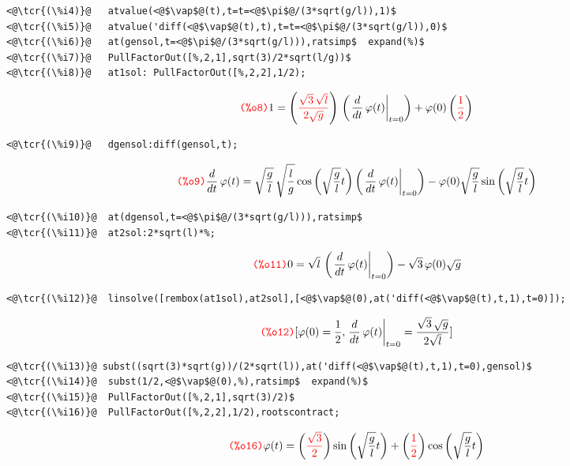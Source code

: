 \documentclass[../Maxima_Workbook.tex]{subfiles}
\begin{document}
\lz \begin{small}
\color{blue} \leqn
\begin{lstlisting}
<@\tcr{(\%i4)}@   atvalue(<@$\vap$@(t),t=t=<@$\pi$@/(3*sqrt(g/l)),1)$
<@\tcr{(\%i5)}@   atvalue('diff(<@$\vap$@(t),t),t=t=<@$\pi$@/(3*sqrt(g/l)),0)$
<@\tcr{(\%i6)}@   at(gensol,t=<@$\pi$@/(3*sqrt(g/l))),ratsimp$  expand(%)$
<@\tcr{(\%i7)}@   PullFactorOut([%,2,1],sqrt(3)/2*sqrt(l/g))$
<@\tcr{(\%i8)}@   at1sol: PullFactorOut([%,2,2],1/2);
\end{lstlisting}
\vspace{-4mm} \[\tag*{\tcr{\ttfamily (\%o8)}} 1=\left( \tcr{\frac{\sqrt{3}\, \sqrt{l}}{2 \sqrt{g}}} \right) \, \left( \left. \frac{d}{d t} \operatorname{\vap }(t)\right|_{t=0}\right) +\operatorname{\vap }(0) \left( \tcr{\frac{1}{2}} \right) \]
\vspace{-5mm} \begin{lstlisting}
<@\tcr{(\%i9)}@   dgensol:diff(gensol,t);
\end{lstlisting}
\vspace{-4mm} \[\tag*{\tcr{\ttfamily (\%o9)}} \frac{d}{d t} \operatorname{\vap }(t)=\sqrt{\frac{g}{l}}\, \sqrt{\frac{l}{g}} \cos{\left( \sqrt{\frac{g}{l}} t\right) } \left( \left. \frac{d}{d t} \operatorname{\vap }(t)\right|_{t=0}\right) -\operatorname{\vap }(0) \sqrt{\frac{g}{l}} \sin{\left( \sqrt{\frac{g}{l}} t\right) } \]
\vspace{-5mm} \begin{lstlisting}
<@\tcr{(\%i10)}@  at(dgensol,t=<@$\pi$@/(3*sqrt(g/l))),ratsimp$
<@\tcr{(\%i11)}@  at2sol:2*sqrt(l)*%;
\end{lstlisting}
\vspace{-4mm} \[\tag*{\tcr{\ttfamily (\%o11)}} 0=\sqrt{l}\, \left( \left. \frac{d}{d t} \operatorname{\vap }(t)\right|_{t=0}\right) -\sqrt{3} \operatorname{\vap }(0) \sqrt{g} \]
\vspace{-5mm} \begin{lstlisting}
<@\tcr{(\%i12)}@  linsolve([rembox(at1sol),at2sol],[<@$\vap$@(0),at('diff(<@$\vap$@(t),t,1),t=0)]);
\end{lstlisting}
\vspace{-4mm} \[\tag*{\tcr{\ttfamily (\%o12)}} [\operatorname{\vap }(0)=\frac{1}{2},\left. \frac{d}{d t} \operatorname{\vap }(t)\right|_{t=0}=\frac{\sqrt{3}\, \sqrt{g}}{2 \sqrt{l}}] \]
\vspace{-5mm} \begin{lstlisting}
<@\tcr{(\%i13)}@ subst((sqrt(3)*sqrt(g))/(2*sqrt(l)),at('diff(<@$\vap$@(t),t,1),t=0),gensol)$
<@\tcr{(\%i14)}@  subst(1/2,<@$\vap$@(0),%),ratsimp$  expand(%)$
<@\tcr{(\%i15)}@  PullFactorOut([%,2,1],sqrt(3)/2)$
<@\tcr{(\%i16)}@  PullFactorOut([%,2,2],1/2),rootscontract;
\end{lstlisting}
\vspace{-4mm} \[\tag*{\tcr{\ttfamily (\%o16)}} \vap(t) =\left( \tcr{\frac{\sqrt{3}}{2}}\right)  \sin{\left( \sqrt{\frac{g}{l}} t\right) }+\left( \tcr{\frac{1}{2}}\right)  \cos{\left( \sqrt{\frac{g}{l}} t\right) } \]
\color{black} \reqn
\end{small} \vspace{-4mm}
\end{document}
